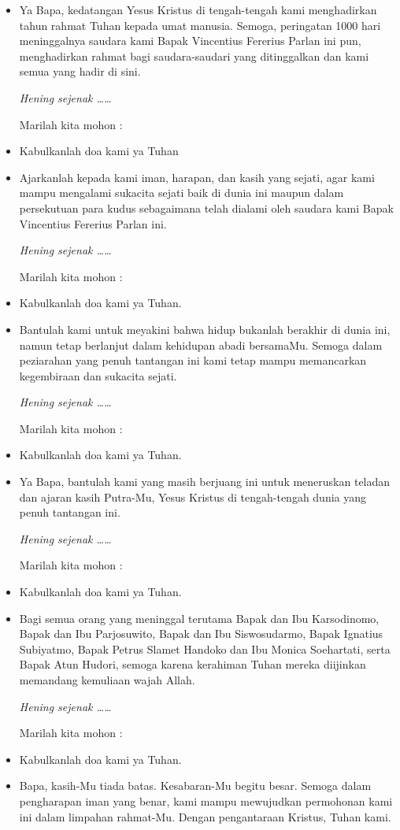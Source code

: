 \documentclass[titlepage,10pt,openany]{scrbook}
\newcommand{\BU}[1]{\begin{itemize} \item[U:] #1 \end{itemize}}
\newcommand{\BI}[1]{\begin{itemize} \item[I:] #1 \end{itemize}}
\newcommand{\BP}[1]{\begin{itemize} \item[P:] #1 \end{itemize}}
\newcommand{\namaalm}{Bapak Vincentius Fererius Parlan\xspace}
\begin{document}
\BP{Ya Bapa, kedatangan Yesus Kristus di tengah-tengah kami menghadirkan tahun rahmat Tuhan kepada umat manusia. Semoga, peringatan 1000 hari meninggalnya saudara kami \namaalm ini pun, menghadirkan rahmat bagi saudara-saudari yang ditinggalkan dan kami semua yang hadir di sini.

\textit{Hening sejenak \ldots\ldots} 

Marilah kita mohon :}

\BU{Kabulkanlah doa kami ya Tuhan}


\BP{Ajarkanlah kepada kami iman, harapan, dan kasih yang sejati, agar kami mampu mengalami sukacita sejati baik di dunia ini maupun dalam persekutuan para kudus sebagaimana telah dialami oleh saudara kami \namaalm ini. 

\textit{Hening sejenak \ldots\ldots} 

Marilah kita mohon :}

\BU{Kabulkanlah doa kami ya Tuhan.}

\BP{Bantulah kami untuk meyakini bahwa hidup bukanlah berakhir di dunia ini, namun tetap berlanjut dalam kehidupan abadi bersamaMu. Semoga dalam peziarahan yang penuh tantangan ini kami tetap mampu memancarkan kegembiraan dan sukacita sejati. 

\textit{Hening sejenak \ldots\ldots} 

Marilah kita mohon :}

\BU{Kabulkanlah doa kami ya Tuhan.}

\BP{Ya Bapa, bantulah kami yang masih berjuang ini untuk meneruskan teladan dan ajaran kasih Putra-Mu, Yesus Kristus di tengah-tengah dunia yang penuh tantangan ini.

\textit{Hening sejenak \ldots\ldots} 

Marilah kita mohon :}

\BU{Kabulkanlah doa kami ya Tuhan.}

\BP{Bagi semua orang yang meninggal terutama Bapak dan Ibu Karsodinomo, Bapak dan Ibu Parjosuwito, Bapak dan Ibu Siswosudarmo, Bapak Ignatius Subiyatmo, Bapak Petrus Slamet Handoko dan Ibu Monica Soehartati, serta Bapak Atun Hudori, semoga karena kerahiman Tuhan mereka diijinkan memandang
	kemuliaan wajah Allah.
	
	\textit{Hening sejenak \ldots\ldots} 
	
	Marilah kita mohon :}

\BU{Kabulkanlah doa kami ya Tuhan.}

\BI{Bapa, kasih-Mu tiada batas. Kesabaran-Mu begitu besar. Semoga dalam pengharapan iman yang benar, kami mampu mewujudkan permohonan kami ini dalam limpahan rahmat-Mu. Dengan pengantaraan Kristus, Tuhan kami.}
\end{document}
